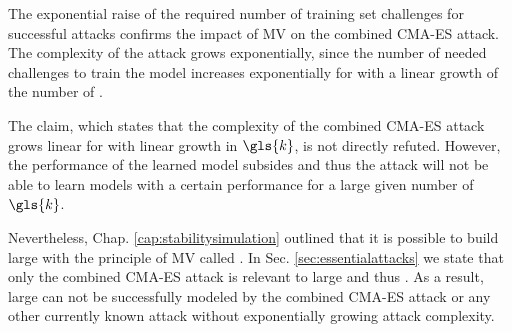 The exponential raise of the required number of training set challenges for successful attacks confirms the impact of \ac{MV} on the combined \ac{CMA-ES} attack.
The complexity of the attack grows exponentially, since the number of needed challenges to train the model increases exponentially for \mxpufs with a linear growth of the number of \mpufs.

The claim, which states that the complexity of the combined \ac{CMA-ES} attack grows linear for \xpufs with linear growth in $\gls{k}$, is not directly refuted.
However, the performance of the learned model subsides and thus the attack will not be able to learn models with a certain performance for a large given number of $\gls{k}$.

Nevertheless, Chap. \ref{cap:stabilitysimulation} outlined that it is possible to build large \xpufs with the principle of \ac{MV} called \mxpufs.
In Sec. \ref{sec:essentialattacks} we state that only the combined \ac{CMA-ES} attack is relevant to large \xpufs and thus \mxpufs.
As a result, large \mxpufs can not be successfully modeled by the combined \ac{CMA-ES} attack or any other currently known attack without exponentially growing attack complexity.


